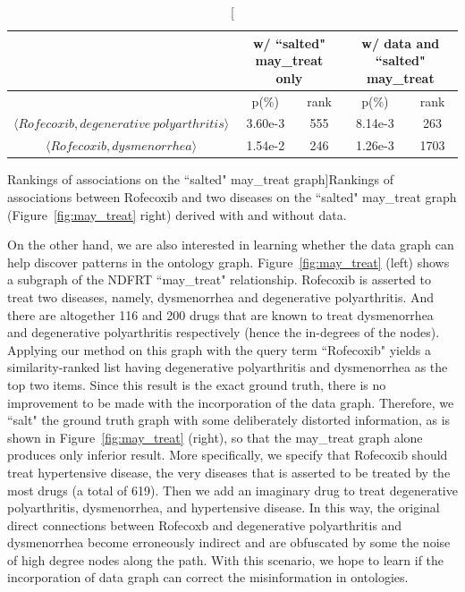 \documentclass{article}
\begin{document}
\begin{table}[tbh]\scriptsize
\begin{center}
\begin{tabular}{ c || c  c || c  c }
\hline
        &   \multicolumn{2}{c||}{w/ ``salted" may\_treat only}    &   \multicolumn{2}{c}{w/ data and ``salted" may\_treat}\\
\hline
\hline
       	&   p(\%)   &   rank    &  p(\%)    &    rank    \\
\hline
$\langle Rofecoxib, degenerative~polyarthritis\rangle$       &   3.60e-3   &   555     &   8.14e-3    &   263    \\
$\langle Rofecoxib, dysmenorrhea\rangle$    &   1.54e-2   &   246     &   1.26e-3    &   1703   \\
\hline
\end{tabular}
\end{center}
\caption[Rankings of associations on the ``salted" may\_treat graph]{\label{tbl:salted_may_treat}Rankings of associations between Rofecoxib and two diseases on the ``salted" may\_treat graph (Figure~\ref{fig:may_treat} right) derived with and without data.}
\end{table}

On the other hand, we are also interested in learning whether the data graph can help discover patterns in the ontology graph. Figure~\ref{fig:may_treat} (left) shows a subgraph of the NDFRT ``may\_treat" relationship. Rofecoxib is asserted to treat two diseases, namely, dysmenorrhea and degenerative polyarthritis. And there are altogether 116 and 200 drugs that are known to treat dysmenorrhea and degenerative polyarthritis respectively (hence the in-degrees of the nodes). Applying our method on this graph with the query term ``Rofecoxib" yields a similarity-ranked list having degenerative polyarthritis and dysmenorrhea as the top two items. Since this result is the exact ground truth, there is no improvement to be made with the incorporation of the data graph. Therefore, we ``salt" the ground truth graph with some deliberately distorted information, as is shown in Figure~\ref{fig:may_treat} (right), so that the may\_treat graph alone produces only inferior result. More specifically, we specify that Rofecoxib should treat hypertensive disease, the very diseases that is asserted to be treated by the most drugs (a total of 619). Then we add an imaginary drug to treat degenerative polyarthritis, dysmenorrhea, and hypertensive disease. In this way, the original direct connections between Rofecoxb and degenerative polyarthritis and dysmenorrhea become erroneously indirect and are obfuscated by some the noise of high degree nodes along the path. With this scenario, we hope to learn if the incorporation of data graph can correct the misinformation in ontologies.
\end{document}
